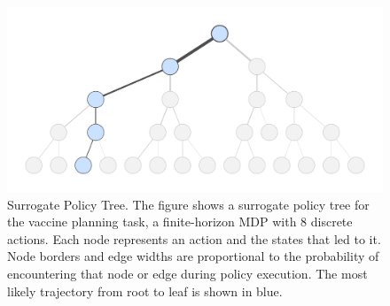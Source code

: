 \documentclass[letterpaper]{article} %
\begin{document}
\begin{figure}[t]
    \centering
    \includegraphics[width=0.99\columnwidth]{figs/vaccine_graph_nodesonly.pdf}
    \caption{Surrogate Policy Tree. The figure shows a surrogate policy tree for the vaccine planning task, a finite-horizon MDP with 8 discrete actions. Each node represents an action and the states that led to it. Node borders and edge widths are proportional to the probability of encountering that node or edge during policy execution. The most likely trajectory from root to leaf is shown in blue.}
    \label{fig: graph unlabeled}
\end{figure}
\end{document}
